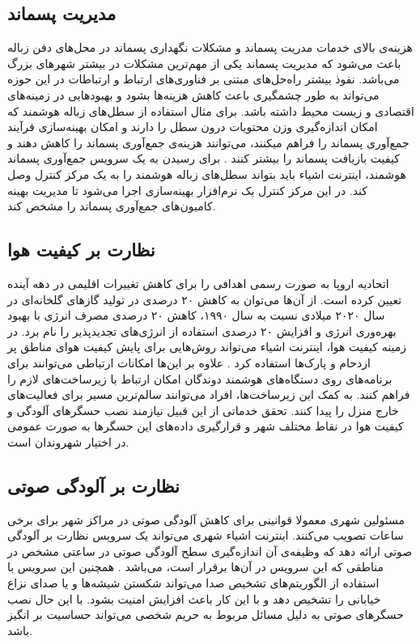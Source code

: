     \subsection{مدیریت پسماند}
      هزینه‌ی بالای خدمات مدریت پسماند و مشکلات نگهداری پسماند در محل‌های دفن زباله باعث می‌شود که مدیریت پسماند یکی از مهم‌ترین مشکلات در بیشتر شهر‌های بزرگ می‌باشد.
      نفوذ بیشتر راه‌حل‌های مبتنی بر فناوری‌های ارتباط و ارتباطات در این حوزه می‌تواند به طور چشمگیری باعث کاهش هزینه‌ها بشود و بهبود‌هایی در زمینه‌های اقتصادی و زیست محیط داشته باشد.
      برای مثال استفاده از سطل‌های زباله هوشمند که امکان اندازه‌گیری وزن محتویات درون سطل را دارند و امکان بهینه‌سازی فرآیند جمع‌آوری پسماند را فراهم میکنند، می‌توانند هزینه‌ی جمع‌آوری پسماند را کاهش دهند و کیفیت بازیافت پسماند را بیشتر کنند \cite{nuortio2006improved}.
      برای رسیدن به یک سرویس جمع‌آوری پسماند هوشمند، اینترنت اشیاء باید بتواند سطل‌های زباله هوشمند را به یک مرکز کنترل وصل کند.
      در این مرکز کنترل یک نرم‌افزار بهینه‌سازی اجرا می‌شود تا مدیریت بهینه کامیون‌های جمع‌آوری پسماند را مشخص کند.

    \subsection{نظارت بر کیفیت هوا}
      اتحادیه اروپا به صورت رسمی اهدافی را برای کاهش تغییرات اقلیمی در دهه آینده تعیین کرده است.
      از آن‌ها می‌توان به کاهش ۲۰ درصدی در تولید گاز‌های گلخانه‌ای در سال ۲۰۲۰ میلادی نسبت به سال ۱۹۹۰، کاهش ۲۰ درصدی مصرف انرژی با بهبود بهره‌وری انرژی و افزایش ۲۰ درصدی استفاده از انرژی‌های تجدید‌پذیر را نام برد.
      در زمینه کیفیت هوا، اینترنت اشیاء می‌تواند روش‌هایی برای پایش کیفیت هوای مناطق پر ازدحام و پارک‌ها استفاده کرد \cite{al2010mobile}.
      علاوه بر این‌ها امکانات ارتباطی می‌توانند برای برنامه‌های روی دستگاه‌های هوشمند دوندگان امکان ارتباط با زیرساخت‌های لازم را فراهم کنند.
      به کمک این زیرساخت‌ها، افراد می‌توانند سالم‌ترین مسیر برای فعالیت‌های خارج منزل را پیدا کنند.
      تحقق خدماتی از این قبیل نیازمند نصب حسگر‌های آلودگی و کیفیت هوا در نقاط مختلف شهر و قرارگیری داده‌های این حسگر‌ها به صورت عمومی در اختیار شهروندان است.

    \subsection{نظارت بر آلودگی صوتی}
      مسئولین شهری معمولا قوانینی برای کاهش آلودگی صوتی در مراکز شهر برای برخی ساعات تصویب می‌کنند.
      اینترنت اشیاء شهری می‌تواند یک سرویس نظارت بر آلودگی صوتی ارائه دهد که وظیفه‌ی آن اندازه‌گیری سطح آلودگی صوتی در ساعتی مشخص در مناطقی که این سرویس در آن‌ها برقرار است، می‌باشد \cite{maisonneuve2009citizen}.
      همچنین این سرویس با استفاده از الگوریتم‌های تشخیص صدا می‌تواند شکستن شیشه‌ها و یا صدای نزاع خیابانی را تشخیص دهد و با این کار باعث افزایش امنیت بشود.
      با این حال نصب حسگر‌های صوتی به دلیل مسائل مربوط به حریم شخصی می‌تواند حساسیت بر انگیز باشد.

